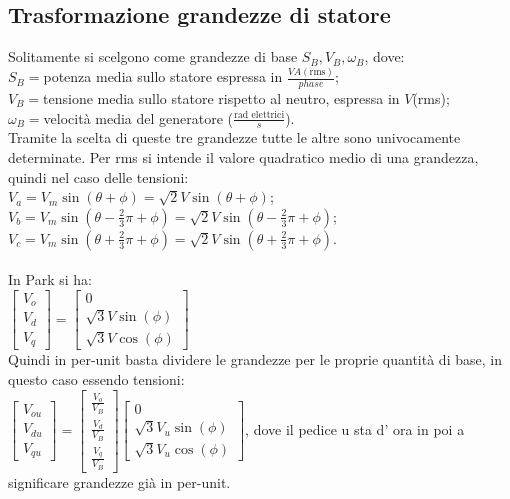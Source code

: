 \documentclass[Lau,noexaminfo]{sapthesis}
\begin{document}
	 \subsection{Trasformazione grandezze di statore}
	 Solitamente si scelgono come grandezze di base $S_B,V_B,\omega_B$, dove:\\
	 $S_B=$potenza media sullo statore espressa in $\frac{VA(\text{rms})}{phase}$;\\
	 $V_B=$tensione media sullo statore rispetto al neutro, espressa in $V$(rms);\\
	 $\omega_B=$velocità media del generatore ($\frac{\text{rad elettrici}}{s}$).\\
	 Tramite la scelta di queste tre grandezze tutte le altre sono univocamente determinate. Per rms si intende il valore quadratico medio di una grandezza, quindi nel caso delle tensioni:\\
	 $V_a=V_m\sin(\theta+\phi)=\sqrt{2}V\sin(\theta+\phi)$;\\
	 $V_b=V_m\sin(\theta-\frac{2}{3}\pi+\phi)=\sqrt{2}V\sin(\theta-\frac{2}{3}\pi+\phi)$;\\
	 $V_c=V_m\sin(\theta+\frac{2}{3}\pi+\phi)=\sqrt{2}V\sin(\theta+\frac{2}{3}\pi+\phi)$.\\\\
	 In Park si ha:\\
	 $\begin{bmatrix}
	 V_o\\
	 V_d\\
	 V_q
	 \end{bmatrix}=
	 \begin{bmatrix}
	 0\\
	 \sqrt{3}V\sin(\phi)\\
	 \sqrt{3}V\cos(\phi)
	 \end{bmatrix}$\\
	 Quindi in per-unit basta dividere le grandezze per le proprie quantità di base, in questo caso essendo tensioni:\\
	 $\begin{bmatrix}
	 V_{ou}\\
	 V_{du}\\
	 V_{qu}
	 \end{bmatrix}=
	 \begin{bmatrix}
	 \frac{V_{o}}{V_B}\\
	 \frac{V_{d}}{V_B}\\
	 \frac{V_{q}}{V_B}
	 \end{bmatrix}
	 \begin{bmatrix}
	 0\\
	 \sqrt{3}V_u\sin(\phi)\\
	 \sqrt{3}V_u\cos(\phi)
	 \end{bmatrix}$, dove il pedice u sta d' ora in poi a significare grandezze già in per-unit.\\\\
\end{document}
